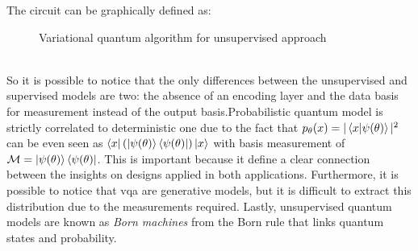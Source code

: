 The circuit can be graphically defined as:
\begin{figure}[!h]
	\centering
	\caption{Variational quantum algorithm for unsupervised approach}
	\label{vqa unsupervised}
\end{figure}\\
So it is possible to notice that the only differences between the unsupervised and supervised models are two: the absence of an encoding layer and the data basis for measurement instead of the output basis.Probabilistic quantum model is strictly correlated to deterministic one due to the fact that $p_\theta(x) = |\braket{x|\psi(\theta)}|^2$ can be even seen as $\bra{x}(\ket{\psi(\theta)} \bra{\psi(\theta)}) \ket{x}$ with basis measurement of $\mathcal{M} = \ket{\psi(\theta)} \bra{\psi(\theta)}$. This is important because it define a clear connection between the insights on designs applied in both applications. Furthermore, it is possible to notice that \acrshort{vqa} are generative models, but it is difficult to extract this distribution due to the measurements required. Lastly, unsupervised quantum models are known as \textit{Born machines} from the Born rule that links quantum states and probability.
